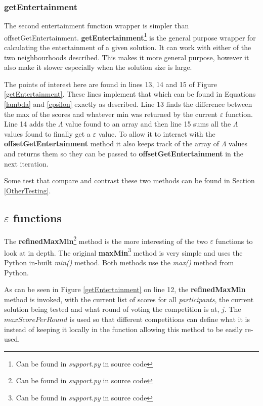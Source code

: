 \documentclass[12pt]{report}
\begin{document}
\subsubsection{getEntertainment}
The second entertainment function wrapper is simpler than {offsetGetEntertainment}. \textbf{getEntertainment}\footnote{Can be found in \textit{support.py} in source code} is the general purpose wrapper for calculating the entertainment of a given solution. It can work with either of the two neighbourhoods described. This makes it more general purpose, however it also make it slower especially when the solution size is large.

The points of interest here are found in lines 13, 14 and 15 of Figure \ref{getEntertainment}. These lines implement that which can be found in Equations \ref{lambda} and \ref{epsilon} exactly as described. Line 13 finds the difference between the max of the scores and whatever min was returned by the current $\varepsilon$ function. Line 14 adds the $\Lambda$ value found to an array and then line 15 sums all the $\Lambda$ values found to finally get a $\varepsilon$ value. To allow it to interact with the \textbf{offsetGetEntertainment} method it also keeps track of the array of $\Lambda$ values and returns them so they can be passed to \textbf{offsetGetEntertainment} in the next iteration.

Some test that compare and contrast these two methods can be found in Section \ref{OtherTesting}.

\subsection{$\varepsilon$ functions}\label{Imp-eFunctions}
The \textbf{refinedMaxMin}\footnote{Can be found in \textit{support.py} in source code} method is the more interesting of the two $\varepsilon$ functions to look at in depth. The original \textbf{maxMin}\footnote{Can be found in \textit{support.py} in source code} method is very simple and uses the Python in-built \textit{min()} \cite{PythonMin} method. Both methods use the \textit{max()} \cite{PythonMax} method from Python.

As can be seen in Figure \ref{getEntertainment} on line 12, the \textbf{refinedMaxMin} method is invoked, with the current list of scores for all \textit{participants}, the current solution being tested and what round of voting the competition is at, $j$. The $maxScorePerRound$ is used so that different competitions can define what it is instead of keeping it locally in the function allowing this method to be easily re-used.
\end{document}
